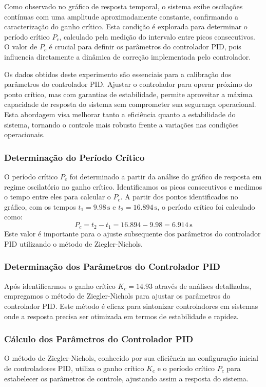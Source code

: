 Como observado no gráfico de resposta temporal, o sistema exibe oscilações contínuas com uma amplitude aproximadamente constante, confirmando a caracterização do ganho crítico. Esta condição é explorada para determinar o período crítico \( P_c \), calculado pela medição do intervalo entre picos consecutivos. O valor de \( P_c \) é crucial para definir os parâmetros do controlador PID, pois influencia diretamente a dinâmica de correção implementada pelo controlador.

Os dados obtidos deste experimento são essenciais para a calibração dos parâmetros do controlador PID. Ajustar o controlador para operar próximo do ponto crítico, mas com garantias de estabilidade, permite aproveitar a máxima capacidade de resposta do sistema sem comprometer sua segurança operacional. Esta abordagem visa melhorar tanto a eficiência quanto a estabilidade do sistema, tornando o controle mais robusto frente a variações nas condições operacionais.

\subsubsection{Determinação do Período Crítico}
O período crítico \( P_c \) foi determinado a partir da análise do gráfico de resposta em regime oscilatório no ganho crítico. Identificamos os picos consecutivos e medimos o tempo entre eles para calcular o \( P_c \). A partir dos pontos identificados no gráfico, com os tempos \( t_1 = 9.98 \, \text{s} \) e \( t_2 = 16.894 \, \text{s} \), o período crítico foi calculado como:
\[
    P_c = t_2 - t_1 = 16.894 - 9.98 = 6.914 \, \text{s}
\]
Este valor é importante para o ajuste subsequente dos parâmetros do controlador PID utilizando o método de Ziegler-Nichols.


\subsubsection{Determinação dos Parâmetros do Controlador PID}
Após identificarmos o ganho crítico \( K_c = 14.93 \) através de análises detalhadas, empregamos o método de Ziegler-Nichols para ajustar os parâmetros do controlador PID. Este método é eficaz para sintonizar controladores em sistemas onde a resposta precisa ser otimizada em termos de estabilidade e rapidez.

\subsubsection{Cálculo dos Parâmetros do Controlador PID}
O método de Ziegler-Nichols, conhecido por sua eficiência na configuração inicial de controladores PID, utiliza o ganho crítico \( K_c \) e o período crítico \( P_c \) para estabelecer os parâmetros de controle, ajustando assim a resposta do sistema.

